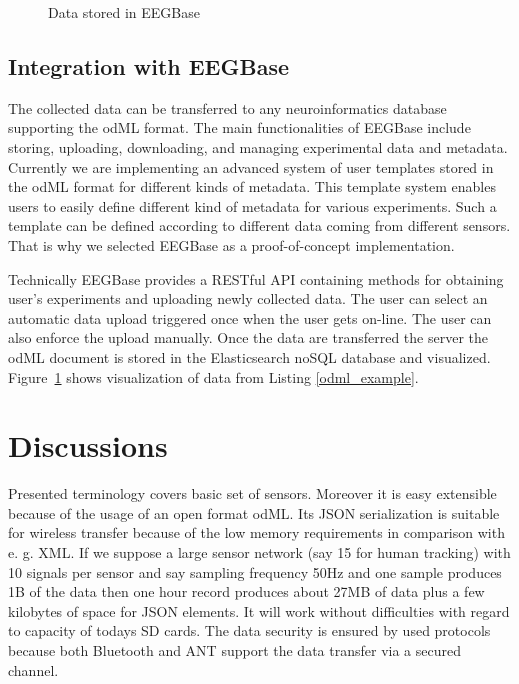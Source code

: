 \documentclass[a4paper,twoside]{article}
\begin{document}
\begin{figure}

  \centering
   {}
  \caption{Data stored in EEGBase}
  \label{fig:EEGBase}
 \end{figure}


\subsection{Integration with EEGBase}

The collected data can be transferred to any neuroinformatics database supporting the odML format. 
The main functionalities of EEGBase include storing, uploading, downloading, and managing experimental data and metadata. Currently we are implementing an advanced system of user templates stored in the odML format for different kinds of metadata. This template system enables users to easily define different kind of metadata for various experiments. Such a template can be defined according to different data coming from different sensors. That is why we selected EEGBase as a proof-of-concept implementation.

Technically EEGBase provides a RESTful API containing methods for obtaining user's experiments and uploading newly collected data. The user can select an automatic data upload triggered once when the user gets on-line. The user can also enforce the upload manually. Once the data are transferred the server the odML document is stored in the Elasticsearch noSQL database and visualized. Figure~\ref{fig:EEGBase} shows visualization of data from Listing \ref{odml_example}.





\section{Discussions}
Presented terminology covers basic set of sensors. Moreover it is easy extensible because of the usage of an open format odML. Its JSON serialization is suitable for wireless transfer because of the low memory requirements in comparison with e. g. XML.  If we suppose a large sensor network (say 15 for human tracking) with 10 signals per sensor and say sampling frequency 50Hz and one sample produces 1B of the data then one hour record produces about 27MB of data plus a few kilobytes of space for JSON elements. It will work without difficulties with regard to capacity of todays SD cards. The data security is ensured by used protocols because both Bluetooth and ANT support the data transfer via a secured channel.
\end{document}
